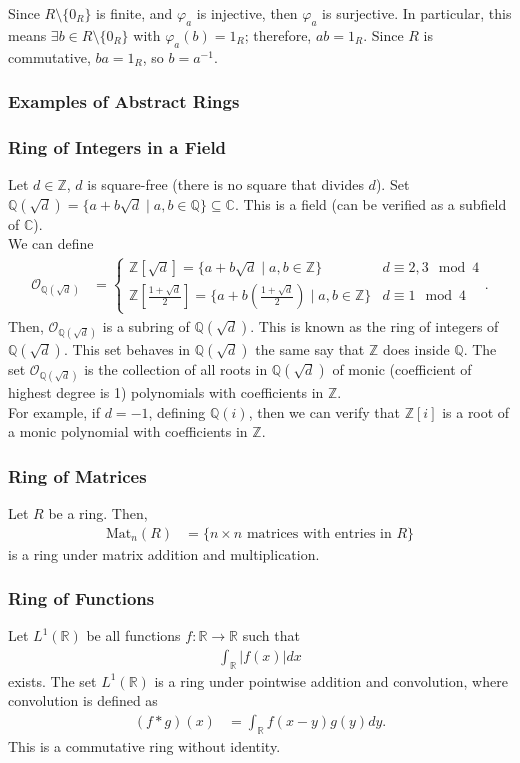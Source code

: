 \documentclass[10pt]{extarticle}
\newcommand{\Q}{\mathbb{Q}}
\newcommand{\Z}{\mathbb{Z}}
\newcommand{\R}{\mathbb{R}}
\newcommand{\C}{\mathbb{C}}
\begin{document}
  Since $R\setminus \{0_R\}$ is finite, and $\varphi_a$ is injective, then $\varphi_a$ is surjective. In particular, this means $\exists b\in R\setminus\{0_R\}$ with $\varphi_a(b) = 1_R$; therefore, $ab = 1_R$. Since $R$ is commutative, $ba = 1_R$, so $b = a^{-1}$.
  \subsubsection{Examples of Abstract Rings}%
  
  \subsubsection{Ring of Integers in a Field}%
  Let $d\in \Z$, $d$ is square-free (there is no square that divides $d$). Set $\Q(\sqrt{d}) = \{a + b\sqrt{d}\mid a,b\in\Q\} \subseteq \C$. This is a field (can be verified as a subfield of $\C$).\\

  We can define
  \begin{align*}
    \mathcal{O}_{\Q\left(\sqrt{d}\right)} &= \begin{cases}
      \Z[\sqrt{d}] = \{a + b\sqrt{d}\mid a,b\in\Z\} & d \equiv 2,3\mod 4\\
      \Z\left[\frac{1 + \sqrt{d}}{2}\right] = \{a + b\left(\frac{1+\sqrt{d}}{2}\right)\mid a,b\in\Z\} & d\equiv 1\mod 4
    \end{cases}.
  \end{align*}
  Then, $\mathcal{O}_{\Q(\sqrt{d})}$ is a subring of $\Q(\sqrt{d})$. This is known as the ring of integers of $\Q(\sqrt{d})$. This set behaves in $\Q(\sqrt{d})$ the same say that $\Z$ does inside $\Q$. The set $\mathcal{O}_{\Q(\sqrt{d})}$ is the collection of all roots in $\Q(\sqrt{d})$ of monic (coefficient of highest degree is 1) polynomials with coefficients in $\Z$.\\

  For example, if $d = -1$, defining $\Q(i)$, then we can verify that $\Z[i]$ is a root of a monic polynomial with coefficients in $\Z$.
  \subsubsection{Ring of Matrices}%
  Let $R$ be a ring. Then,
  \begin{align*}
    \text{Mat}_{n}(R) &= \{\text{$n\times n$ matrices with entries in $R$}\}
  \end{align*}
  is a ring under matrix addition and multiplication.
  \subsubsection{Ring of Functions}%
  Let $L^{1}(\R)$ be all functions $f: \R\rightarrow\R$ such that
  \begin{align*}
    \int_{\R}|f(x)|dx
  \end{align*}
  exists. The set $L^{1}(\R)$ is a ring under pointwise addition and convolution, where convolution is defined as
  \begin{align*}
    \left(f\ast g\right)(x) &= \int_{\R}f(x-y)g(y)dy.
  \end{align*}
  This is a commutative ring without identity.
\end{document}
